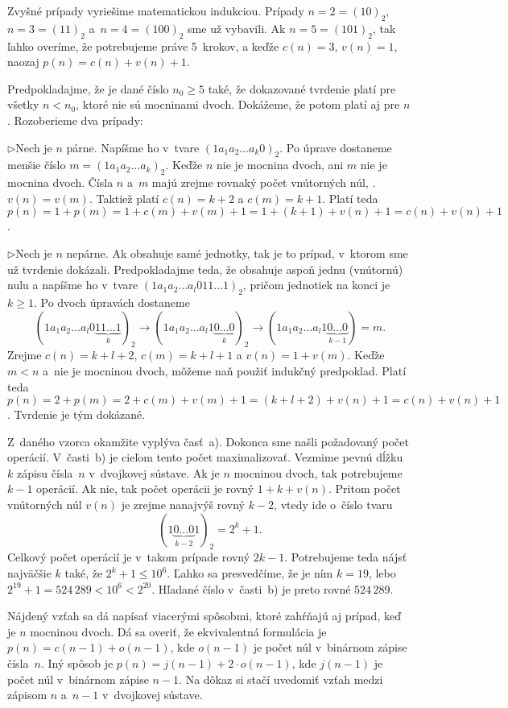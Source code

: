 {Zvyšné prípady vyriešime matematickou indukciou. Prípady $n=2 =(10)_2$, $n=3=(11)_2$ a~$n=4=(100)_2$ sme už vybavili. Ak $n=5 =(101)_2$, tak ľahko overíme, že potrebujeme práve 5~krokov, a keďže $c(n)=3$, $v(n)=1$, naozaj $p(n)=c(n)+v(n)+1$.

Predpokladajme, že je dané číslo $n_0 \ge 5$ také, že dokazované tvrdenie platí pre všetky $n<n_0$, ktoré nie sú mocninami dvoch. Dokážeme, že potom platí aj pre $n$. Rozoberieme dva prípady:

\smallskip
\item{$\triangleright$}Nech je $n$ párne. Napíšme ho v~tvare $(1a_1a_2 \ldots a_k 0)_2$. Po úprave dostaneme menšie číslo $m=(1a_1a_2\dots a_k)_2$. Keďže $n$ nie je mocnina dvoch, ani $m$ nie je mocnina dvoch. Čísla $n$ a~$m$ majú zrejme rovnaký počet vnútorných núl, \tj. $v(n)=v(m)$. Taktiež platí $c(n)=k+2$ a $c(m)=k+1$. Platí teda $p(n)=1+p(m)=1+c(m)+v(m)+1=1+(k+1)+v(n)+1=c(n)+v(n)+1$.

\smallskip
\item{$\triangleright$}Nech je $n$ nepárne. Ak obsahuje samé jednotky, tak je to prípad, v~ktorom sme už tvrdenie dokázali. Predpokladajme teda, že obsahuje aspoň jednu (vnútornú) nulu a napíšme ho v~tvare $(1a_1a_2\ldots a_l 011 \ldots 1)_2$, pričom jednotiek na konci je $k \ge 1$. Po dvoch úpravách dostaneme
     $$
     (1a_1a_2\ldots a_l 0\underbrace{11 \ldots 1}_k)_2 \to (1a_1a_2\ldots a_l 1 \underbrace{0 \ldots 0}_{k})_2 \to (1a_1a_2\ldots a_l1\underbrace{0 \ldots 0}_{k-1}) = m.
     $$
     Zrejme $c(n)=k+l+2$, $c(m)=k+l+1$ a $v(n)=1+v(m)$. Keďže $m<n$ a~nie je mocninou dvoch, môžeme naň použiť indukčný predpoklad. Platí teda $p(n)=2+p(m)=2+c(m)+v(m)+1=(k+l+2)+v(n)+1=c(n)+v(n)+1$. Tvrdenie je tým dokázané.

\smallskip\noindent
Z~daného vzorca okamžite vyplýva časť~a). Dokonca sme našli požadovaný počet operácií. V~časti~b) je cieľom tento počet maximalizovať. Vezmime pevnú dĺžku~$k$ zápisu čísla~$n$ v~dvojkovej sústave. Ak je $n$ mocninou dvoch, tak potrebujeme $k-1$ operácií. Ak nie, tak počet operácii je rovný $1+k+v(n)$. Pritom počet vnútorných núl $v(n)$ je zrejme nanajvýš rovný $k-2$, vtedy ide o~číslo tvaru
$$
(1\underbrace{0\ldots 0}_{k-2}1)_2=2^k+1.
$$
Celkový počet operácií je v~takom prípade rovný $2k-1$. Potrebujeme teda nájsť najväčšie $k$ také, že $2^k+1 \le 10^6$. Ľahko sa presvedčíme, že je ním $k=19$, lebo $2^{19}+1 = 524\,289 < 10^6 < 2^{20}$. Hľadané číslo v~časti~b) je preto rovné $524\,289$.

\poznamka
Nájdený vzťah sa dá napísať viacerými spôsobmi, ktoré zahŕňajú aj prípad, keď je $n$ mocninou dvoch. Dá sa overiť, že ekvivalentná formulácia je $p(n)={c(n-1)}+o(n-1)$, kde $o(n-1)$ je počet núl v~binárnom zápise čísla~$n$. Iný spôsob je $p(n) = j(n-1) + 2 \cdot o(n-1)$, kde $j(n-1)$ je počet núl v~binárnom zápise $n-1$. Na dôkaz si stačí uvedomiť vzťah medzi zápisom $n$ a~$n-1$ v~dvojkovej sústave.

}
